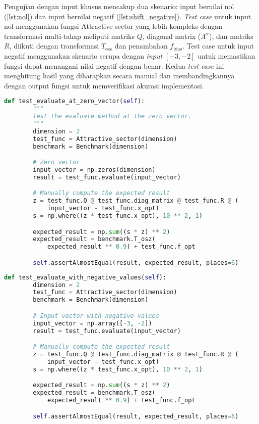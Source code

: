 Pengujian dengan input khusus mencakup dua skenario: input bernilai nol (\cref{lst:nol}) dan input bernilai negatif (\cref{lst:shift_negative}). \textit{Test case} untuk input nol menggunakan fungsi Attractive sector yang lebih kompleks dengan transformasi multi-tahap meliputi matriks $Q$, diagonal matrix ($\Lambda^{\alpha}$), dan matriks $R$, diikuti dengan transformasi $T_{\text{osz}}$ dan penambahan $f_{\text{bias}}$. Test case untuk input negatif menggunakan skenario serupa dengan \textit{input} $[-3, -2]$ untuk memastikan fungsi dapat menangani nilai negatif dengan benar. Kedua \textit{test case} ini menghitung hasil yang diharapkan secara manual dan membandingkannya dengan output fungsi untuk memverifikasi akurasi implementasi.
\begin{lstlisting}[language=Python, caption=\textit{Test case} dengan input bernilai nol, label=lst:nol]
    def test_evaluate_at_zero_vector(self):
        """
        Test the evaluate method at the zero vector.
        """
        dimension = 2
        test_func = Attractive_sector(dimension)
        benchmark = Benchmark(dimension)

        # Zero vector
        input_vector = np.zeros(dimension)
        result = test_func.evaluate(input_vector)

        # Manually compute the expected result
        z = test_func.Q @ test_func.diag_matrix @ test_func.R @ (
            input_vector - test_func.x_opt)
        s = np.where((z * test_func.x_opt), 10 ** 2, 1)

        expected_result = np.sum((s * z) ** 2)
        expected_result = benchmark.T_osz(
            expected_result ** 0.9) + test_func.f_opt

        self.assertAlmostEqual(result, expected_result, places=6)
\end{lstlisting}
\begin{lstlisting}[language=Python, caption=\textit{Test case} dengan input bernilai negatif, label=lst:negative]
    def test_evaluate_with_negative_values(self):
        dimension = 2
        test_func = Attractive_sector(dimension)
        benchmark = Benchmark(dimension)

        # Input vector with negative values
        input_vector = np.array([-3, -2])
        result = test_func.evaluate(input_vector)

        # Manually compute the expected result
        z = test_func.Q @ test_func.diag_matrix @ test_func.R @ (
            input_vector - test_func.x_opt)
        s = np.where((z * test_func.x_opt), 10 ** 2, 1)

        expected_result = np.sum((s * z) ** 2)
        expected_result = benchmark.T_osz(
            expected_result ** 0.9) + test_func.f_opt

        self.assertAlmostEqual(result, expected_result, places=6)
\end{lstlisting}

